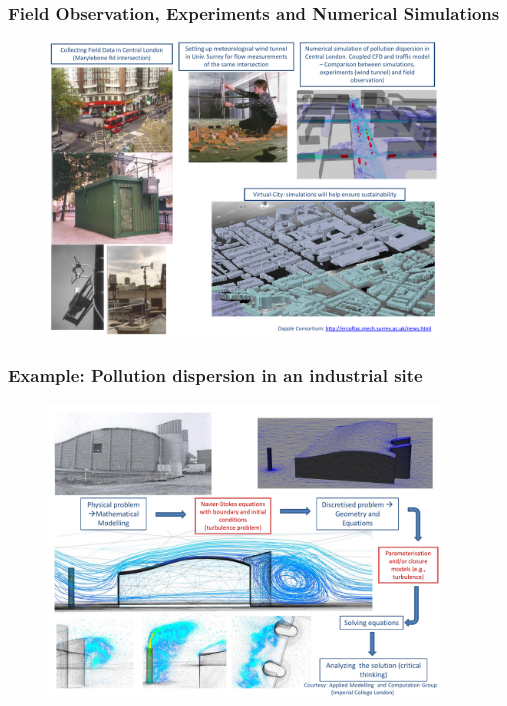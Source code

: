 \documentclass[10pt,compress, unknownkeysallowed]{beamer}
\begin{document}
\begin{frame}
 \frametitle{Field Observation, Experiments and Numerical Simulations} 

   \begin{figure}%
    \begin{center}
     \includegraphics[width=12.cm, height=7.8cm, clip]{./Figs/Dapple.pdf}
    \end{center}
   \end{figure}    
\end{frame}
\begin{frame}
 \frametitle{Example: Pollution dispersion in an industrial site}

   \begin{figure}%
    \begin{center}
     \includegraphics[width=12.cm, height=7.8cm, clip]{./Figs/SpecificIndustrialEnvironmentalApplication.pdf}
    \end{center}
   \end{figure}    

\end{frame}
\end{document}
